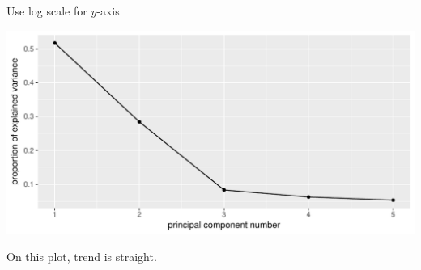 \begin{frame}[fragile]{Use log scale for $y$-axis}

\begin{knitrout}
\color{fgcolor}\begin{kframe}
\begin{alltt}
\hlstd{(}\hlopt{+}
  \hlstd{()}\hlopt{+}\hlstd{(}\hlstd{=}\hlstd{)}
\end{alltt}
\end{kframe}
\includegraphics[width=\maxwidth]{figure/unnamed-chunk-17-1} 

\end{knitrout}

On this plot, trend is straight.

\end{frame}
